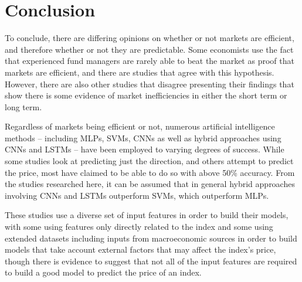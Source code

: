 \section{Conclusion}
To conclude, there are differing opinions on whether or not markets are efficient, and therefore whether or not they are predictable. Some economists use the fact that experienced fund managers are rarely able to beat the market as proof that markets are efficient, and there are studies that agree with this hypothesis. However, there are also other studies that disagree presenting their findings that show there is some evidence of market inefficiencies in either the short term or long term.

Regardless of markets being efficient or not, numerous artificial intelligence methods -- including MLPs, SVMs, CNNs as well as hybrid approaches using CNNs and LSTMs -- have been employed to varying degrees of success. While some studies look at predicting just the direction, and others attempt to predict the price, most have claimed to be able to do so with above 50\% accuracy. From the studies researched here, it can be assumed that in general hybrid approaches involving CNNs and LSTMs outperform SVMs, which outperform MLPs.

These studies use a diverse set of input features in order to build their models, with some using features only directly related to the index and some using extended datasets including inputs from macroeconomic sources in order to build models that take account external factors that may affect the index's price, though there is evidence to suggest that not all of the input features are required to build a good model to predict the price of an index.